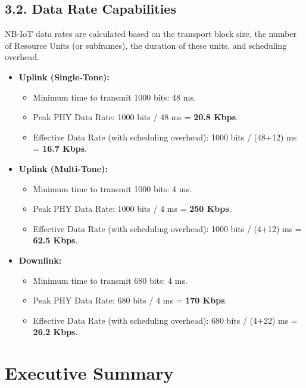 \documentclass[a4paper, 12pt]{book} %
\begin{document}
\subsection{3.2. Data Rate Capabilities}\label{data-rate-capabilities}

NB-IoT data rates are calculated based on the transport block size, the
number of Resource Units (or subframes), the duration of these units,
and scheduling overhead.

\begin{itemize}
\tightlist
\item
  \textbf{Uplink (Single-Tone):}

  \begin{itemize}
  \tightlist
  \item
    Minimum time to transmit 1000 bits: 48 ms.
  \item
    Peak PHY Data Rate: 1000 bits / 48 ms = \textbf{20.8 Kbps}.
  \item
    Effective Data Rate (with scheduling overhead): 1000 bits / (48+12)
    ms = \textbf{16.7 Kbps}.
  \end{itemize}
\item
  \textbf{Uplink (Multi-Tone):}

  \begin{itemize}
  \tightlist
  \item
    Minimum time to transmit 1000 bits: 4 ms.
  \item
    Peak PHY Data Rate: 1000 bits / 4 ms = \textbf{250 Kbps}.
  \item
    Effective Data Rate (with scheduling overhead): 1000 bits / (4+12)
    ms = \textbf{62.5 Kbps}.
  \end{itemize}
\item
  \textbf{Downlink:}

  \begin{itemize}
  \tightlist
  \item
    Minimum time to transmit 680 bits: 4 ms.
  \item
    Peak PHY Data Rate: 680 bits / 4 ms = \textbf{170 Kbps}.
  \item
    Effective Data Rate (with scheduling overhead): 680 bits / (4+22) ms
    = \textbf{26.2 Kbps}.
  \end{itemize}
\end{itemize}


\section{Executive Summary}\label{executive-summary}
\end{document}
